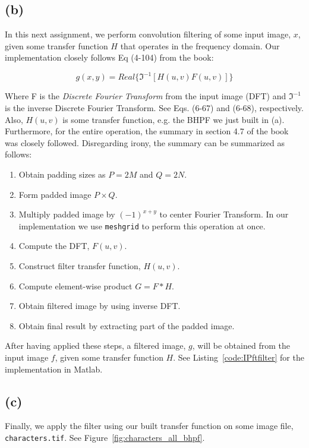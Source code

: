 \documentclass{article}
\begin{document}
\subsection*{(b)} In this next assignment, we perform convolution filtering of some input image, $x$, given some transfer function $H$ that operates in the frequency domain. Our implementation closely follows Eq (4-104) from the book:

\[
g(x, y) = Real\{\Im^{-1}[H(u,v)F(u, v)]\}
\]

Where F is the \textit{Discrete Fourier Transform} from the input image (DFT) and $\Im^{-1}$ is the inverse Discrete Fourier Transform. See Eqs. (6-67) and (6-68), respectively. Also, $H(u, v)$ is some transfer function, e.g. the BHPF we just built in (a). Furthermore, for the entire operation, the summary in section 4.7 of the book was closely followed. Disregarding irony, the summary can be summarized as follows:

\begin{enumerate}
    \item Obtain padding sizes as $P = 2M$ and $Q = 2N$.
    \item Form padded image $P \times Q$.
    \item Multiply padded image by $(-1)^{x+y}$ to center Fourier Transform. In our implementation we use \texttt{meshgrid} to perform this operation at once.
    \item Compute the DFT, $F(u, v)$.
    \item Construct filter transfer function, $H(u, v)$.
    \item Compute element-wise product $G = F * H$.
    \item Obtain filtered image by using inverse DFT.
    \item Obtain final result by extracting part of the padded image.
\end{enumerate}

After having applied these steps, a filtered image, $g$, will be obtained from the input image $f$, given some transfer function $H$. See  Listing~\ref{code:IPftfilter} for the implementation in Matlab.

\subsection*{(c)} Finally, we apply the filter using our built transfer function on some image file, \texttt{characters.tif}. See Figure~\ref{fig:characters_all_bhpf}.
\end{document}
